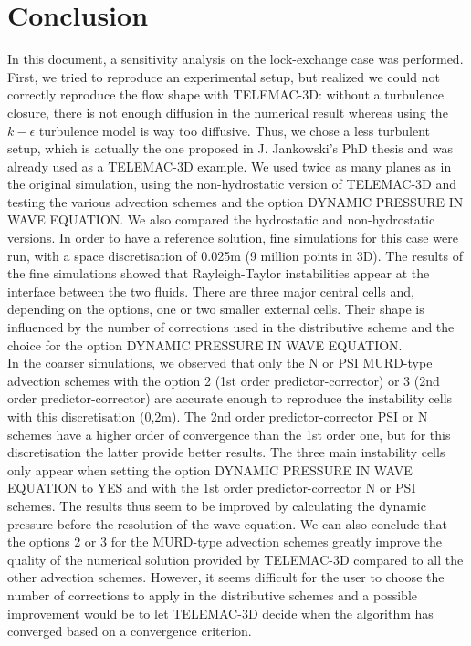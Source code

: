 \section{Conclusion}
%
In this document, a sensitivity analysis on the lock-exchange case was performed.
First, we tried to reproduce an experimental setup, but realized we could not
correctly reproduce the flow shape with TELEMAC-3D: without a turbulence closure,
there is not enough diffusion in the numerical result whereas using the $k-\epsilon$
turbulence model is way too diffusive. Thus, we chose a less turbulent setup, which
is actually the one proposed in J. Jankowski's PhD thesis and was already used as a TELEMAC-3D example.
We used twice as many planes as in the original simulation, using the non-hydrostatic
version of TELEMAC-3D and testing the various advection schemes and the option DYNAMIC PRESSURE IN
WAVE EQUATION. We also compared the hydrostatic and non-hydrostatic versions.
In order to have a reference solution, fine simulations for this case were run,
with a space discretisation of 0.025m (9 million points in 3D).
The results of the fine simulations showed that Rayleigh-Taylor instabilities appear at the
interface between the two fluids. There are three major central cells and, depending on
the options, one or two smaller external cells. Their shape is influenced by the number of corrections
used in the distributive scheme and the choice for the option DYNAMIC PRESSURE IN WAVE EQUATION.\\

In the coarser simulations, we observed that only the N or PSI MURD-type
advection schemes with the option 2 (1st order predictor-corrector) or 3 (2nd order predictor-corrector)
are accurate enough to reproduce the instability cells with this discretisation (0,2m).
The 2nd order predictor-corrector PSI or N schemes have a higher order of
convergence than the 1st order one, but for this discretisation the latter
provide better results. The three main instability cells only appear when setting the option
DYNAMIC PRESSURE IN WAVE EQUATION to YES and with the 1st order predictor-corrector N or PSI schemes.
The results thus seem to be improved by calculating the dynamic pressure before the
resolution of the wave equation. We can also conclude that the options 2 or 3 for the MURD-type
advection schemes greatly improve the quality of the numerical solution provided by TELEMAC-3D
compared to all the other advection schemes.
However, it seems difficult for the user to choose the number of corrections to apply
in the distributive schemes and a possible improvement
would be to let TELEMAC-3D decide when the algorithm has converged based
on a convergence criterion. \\

